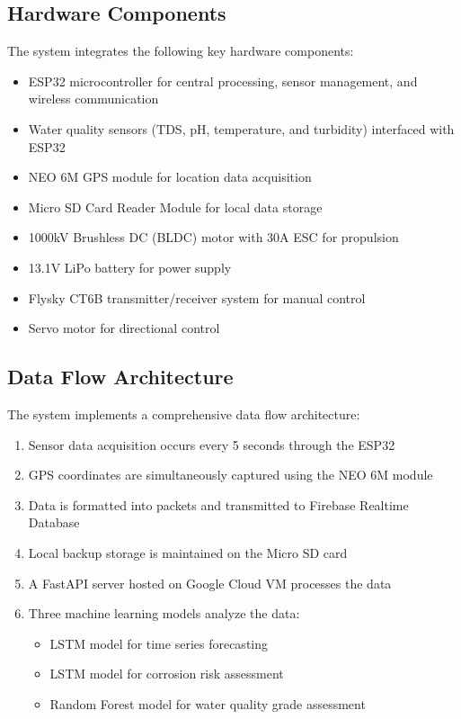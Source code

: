 \documentclass[conference]{IEEEtran}
\begin{document}
\subsection{Hardware Components}
The system integrates the following key hardware components:
\begin{itemize}
\item ESP32 microcontroller for central processing, sensor management, and wireless communication
\item Water quality sensors (TDS, pH, temperature, and turbidity) interfaced with ESP32
\item NEO 6M GPS module for location data acquisition
\item Micro SD Card Reader Module for local data storage
\item 1000kV Brushless DC (BLDC) motor with 30A ESC for propulsion
\item 13.1V LiPo battery for power supply
\item Flysky CT6B transmitter/receiver system for manual control
\item Servo motor for directional control
\end{itemize}

\subsection{Data Flow Architecture}
The system implements a comprehensive data flow architecture:
\begin{enumerate}
\item Sensor data acquisition occurs every 5 seconds through the ESP32
\item GPS coordinates are simultaneously captured using the NEO 6M module
\item Data is formatted into packets and transmitted to Firebase Realtime Database
\item Local backup storage is maintained on the Micro SD card
\item A FastAPI server hosted on Google Cloud VM processes the data
\item Three machine learning models analyze the data:
    \begin{itemize}
    \item LSTM model for time series forecasting
    \item LSTM model for corrosion risk assessment
    \item Random Forest model for water quality grade assessment
    \end{itemize}
\end{enumerate}
\end{document}
